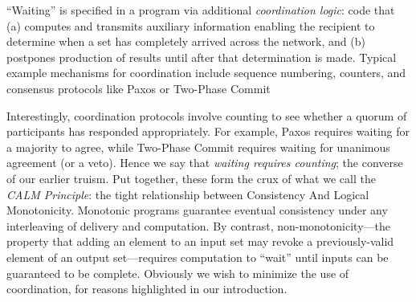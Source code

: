 ``Waiting'' is specified in a program via additional \emph{coordination logic}:  code that (a) computes and transmits auxiliary information enabling the recipient to determine when a set has completely arrived across the network, and (b) postpones production of results until after that determination is made.  Typical example mechanisms for coordination include sequence numbering, counters, and consensus protocols like Paxos or Two-Phase Commit

Interestingly, coordination protocols involve counting to see whether a quorum of participants has responded appropriately.  For example, Paxos requires waiting for a majority to agree, while Two-Phase Commit requires waiting for unanimous agreement (or a veto).  Hence we say that {\em waiting requires counting}; the converse of our earlier truism.  Put together, these form the crux of what we call the {\em CALM Principle}: the tight relationship between Consistency And Logical Monotonicity.  Monotonic programs guarantee eventual consistency under any interleaving of delivery and computation.  By contrast, non-monotonicity---the property that adding an element to an input set may revoke a previously-valid element of an output set---requires computation to ``wait'' until inputs can be guaranteed to be complete.  Obviously we wish to minimize the use of coordination, for reasons highlighted in our introduction.

